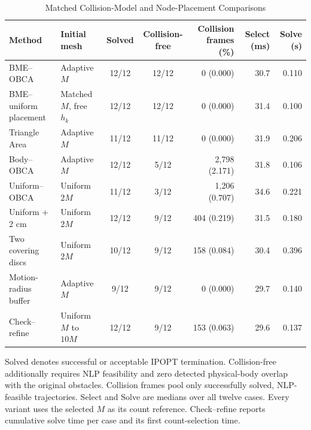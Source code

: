\begin{table}[t]
\caption{Matched Collision-Model and Node-Placement Comparisons}\label{tab:comparison}
\centering\footnotesize
\begin{tabular}{@{}llccrrr@{}}\toprule
Method&Initial mesh&Solved&Collision-free&Collision frames (\%)&Select (ms)&Solve (s)\\\midrule
BME--OBCA&Adaptive $M$&12/12&12/12&0 (0.000)&30.7&0.110\\
BME--uniform placement&Matched $M$, free $h_k$&12/12&12/12&0 (0.000)&31.4&0.100\\
Triangle Area&Adaptive $M$&11/12&11/12&0 (0.000)&31.9&0.206\\
Body--OBCA&Adaptive $M$&12/12&5/12&2,798 (2.171)&31.8&0.106\\
Uniform--OBCA&Uniform $2M$&11/12&3/12&1,206 (0.707)&34.6&0.221\\
Uniform + 2 cm&Uniform $2M$&12/12&9/12&404 (0.219)&31.5&0.180\\
Two covering discs&Uniform $2M$&10/12&9/12&158 (0.084)&30.4&0.396\\
Motion-radius buffer&Adaptive $M$&9/12&9/12&0 (0.000)&29.7&0.140\\
Check--refine&Uniform $M$ to $10M$&12/12&9/12&153 (0.063)&29.6&0.137\\
\bottomrule\end{tabular}
\par\par\smallskip\parbox{\textwidth}{\footnotesize Solved denotes successful or acceptable IPOPT termination. Collision-free additionally requires NLP feasibility and zero detected physical-body overlap with the original obstacles. Collision frames pool only successfully solved, NLP-feasible trajectories. Select and Solve are medians over all twelve cases. Every variant uses the selected $M$ as its count reference. Check--refine reports cumulative solve time per case and its first count-selection time.}
\end{table}